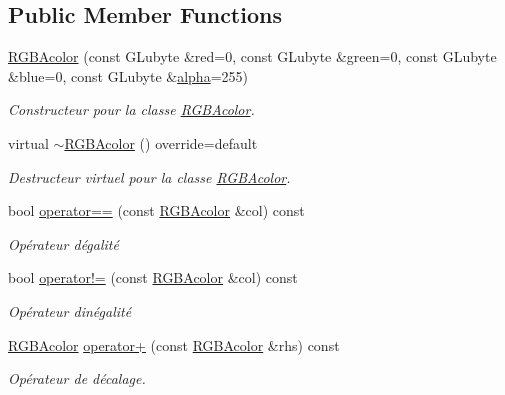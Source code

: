 \subsection*{Public Member Functions}
\begin{DoxyCompactItemize}
\item 
\hyperlink{classns_graphics_1_1_r_g_b_acolor_a6f91976b2d83414329608564615f27b1}{R\+G\+B\+Acolor} (const G\+Lubyte \&red=0, const G\+Lubyte \&green=0, const G\+Lubyte \&blue=0, const G\+Lubyte \&\hyperlink{get_pseudo_8cpp_a91dd017bd061f2dac37ce9b6e37cb360}{alpha}=255)
\begin{DoxyCompactList}\small\item\em Constructeur pour la classe \hyperlink{classns_graphics_1_1_r_g_b_acolor}{R\+G\+B\+Acolor}. \end{DoxyCompactList}\item 
virtual \hyperlink{classns_graphics_1_1_r_g_b_acolor_a229faf986de81a508c37103ca013ad70}{$\sim$\+R\+G\+B\+Acolor} () override=default
\begin{DoxyCompactList}\small\item\em Destructeur virtuel pour la classe \hyperlink{classns_graphics_1_1_r_g_b_acolor}{R\+G\+B\+Acolor}. \end{DoxyCompactList}\item 
bool \hyperlink{classns_graphics_1_1_r_g_b_acolor_a685b4a48d19594bd29f136e1f74fee85}{operator==} (const \hyperlink{classns_graphics_1_1_r_g_b_acolor}{R\+G\+B\+Acolor} \&col) const
\begin{DoxyCompactList}\small\item\em Opérateur d\textquotesingle{}égalité \end{DoxyCompactList}\item 
bool \hyperlink{classns_graphics_1_1_r_g_b_acolor_a2cf7ff27443450c18368d521546f4e9e}{operator!=} (const \hyperlink{classns_graphics_1_1_r_g_b_acolor}{R\+G\+B\+Acolor} \&col) const
\begin{DoxyCompactList}\small\item\em Opérateur d\textquotesingle{}inégalité \end{DoxyCompactList}\item 
\hyperlink{classns_graphics_1_1_r_g_b_acolor}{R\+G\+B\+Acolor} \hyperlink{classns_graphics_1_1_r_g_b_acolor_abb3832c60bec568d1b357955e6be2300}{operator+} (const \hyperlink{classns_graphics_1_1_r_g_b_acolor}{R\+G\+B\+Acolor} \&rhs) const
\begin{DoxyCompactList}\small\item\em Opérateur de décalage. \end{DoxyCompactList}\item 

\end{DoxyCompactItemize}
